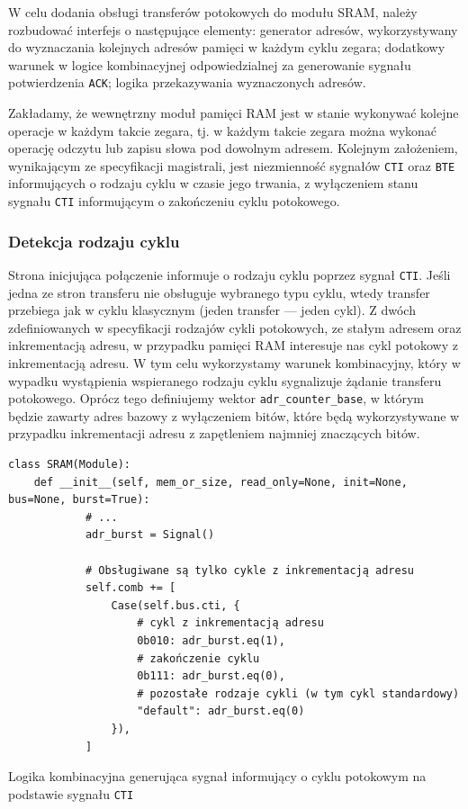 W celu dodania obsługi transferów potokowych do modułu SRAM, należy rozbudować interfejs o następujące elementy: generator adresów, wykorzystywany do wyznaczania kolejnych adresów pamięci w każdym cyklu zegara; dodatkowy warunek w logice kombinacyjnej odpowiedzialnej za generowanie sygnału potwierdzenia \texttt{ACK}; logika przekazywania wyznaczonych adresów.

Zakładamy, że wewnętrzny moduł pamięci RAM jest w stanie wykonywać kolejne operacje w każdym takcie zegara, tj. w każdym takcie zegara można wykonać operację odczytu lub zapisu słowa pod dowolnym adresem.
Kolejnym założeniem, wynikającym ze specyfikacji magistrali, jest niezmienność sygnałów \texttt{CTI} oraz \texttt{BTE} informujących o rodzaju cyklu w czasie jego trwania, z wyłączeniem stanu sygnału \texttt{CTI} informującym o zakończeniu cyklu potokowego.

\subsubsection{Detekcja rodzaju cyklu}

Strona inicjująca połączenie informuje o rodzaju cyklu poprzez sygnał \texttt{CTI}. Jeśli jedna ze stron transferu nie obsługuje wybranego typu cyklu, wtedy transfer przebiega jak w cyklu klasycznym (jeden transfer --- jeden cykl).
Z dwóch zdefiniowanych w specyfikacji rodzajów cykli potokowych, ze stałym adresem oraz inkrementacją adresu, w przypadku pamięci RAM interesuje nas cykl potokowy z inkrementacją adresu. W tym celu wykorzystamy warunek kombinacyjny, który w wypadku wystąpienia wspieranego rodzaju cyklu sygnalizuje żądanie transferu potokowego.
Oprócz tego definiujemy wektor \texttt{adr_counter_base}, w którym będzie zawarty adres bazowy z wyłączeniem bitów, które będą wykorzystywane w przypadku inkrementacji adresu z zapętleniem najmniej znaczących bitów.

\begin{listing}[H]
\begin{verbatim}
class SRAM(Module):
    def __init__(self, mem_or_size, read_only=None, init=None, bus=None, burst=True):
            # ...
            adr_burst = Signal()

            # Obsługiwane są tylko cykle z inkrementacją adresu
            self.comb += [
                Case(self.bus.cti, {
                    # cykl z inkrementacją adresu
                    0b010: adr_burst.eq(1),
                    # zakończenie cyklu
                    0b111: adr_burst.eq(0),
                    # pozostałe rodzaje cykli (w tym cykl standardowy)
                    "default": adr_burst.eq(0)
                }),
            ]
\end{verbatim}
\caption{Logika kombinacyjna generująca sygnał informujący o cyklu potokowym na podstawie sygnału \texttt{CTI}}
\label{lst:impl-sram-detect}
\end{listing}

